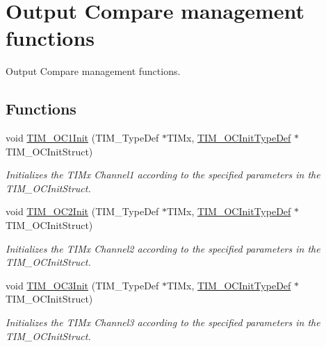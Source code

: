 \hypertarget{group___t_i_m___group2}{\section{Output Compare management functions}
\label{group___t_i_m___group2}
}


Output Compare management functions.  


\subsection*{Functions}
\begin{DoxyCompactItemize}
\item 
void \hyperlink{group___t_i_m___group2_gafcdb6ff00158862aef7fed5e7a554a3e}{T\-I\-M\-\_\-\-O\-C1\-Init} (T\-I\-M\-\_\-\-Type\-Def $\ast$T\-I\-Mx, \hyperlink{struct_t_i_m___o_c_init_type_def}{T\-I\-M\-\_\-\-O\-C\-Init\-Type\-Def} $\ast$T\-I\-M\-\_\-\-O\-C\-Init\-Struct)
\begin{DoxyCompactList}\small\item\em Initializes the T\-I\-Mx Channel1 according to the specified parameters in the T\-I\-M\-\_\-\-O\-C\-Init\-Struct. \end{DoxyCompactList}\item 
void \hyperlink{group___t_i_m___group2_ga2017455121d910d6ff63ac6f219842c5}{T\-I\-M\-\_\-\-O\-C2\-Init} (T\-I\-M\-\_\-\-Type\-Def $\ast$T\-I\-Mx, \hyperlink{struct_t_i_m___o_c_init_type_def}{T\-I\-M\-\_\-\-O\-C\-Init\-Type\-Def} $\ast$T\-I\-M\-\_\-\-O\-C\-Init\-Struct)
\begin{DoxyCompactList}\small\item\em Initializes the T\-I\-Mx Channel2 according to the specified parameters in the T\-I\-M\-\_\-\-O\-C\-Init\-Struct. \end{DoxyCompactList}\item 
void \hyperlink{group___t_i_m___group2_ga90d4a358d4e6d4c5ed17dc1d6beb5f30}{T\-I\-M\-\_\-\-O\-C3\-Init} (T\-I\-M\-\_\-\-Type\-Def $\ast$T\-I\-Mx, \hyperlink{struct_t_i_m___o_c_init_type_def}{T\-I\-M\-\_\-\-O\-C\-Init\-Type\-Def} $\ast$T\-I\-M\-\_\-\-O\-C\-Init\-Struct)
\begin{DoxyCompactList}\small\item\em Initializes the T\-I\-Mx Channel3 according to the specified parameters in the T\-I\-M\-\_\-\-O\-C\-Init\-Struct. \end{DoxyCompactList}\item 

\end{DoxyCompactItemize}
